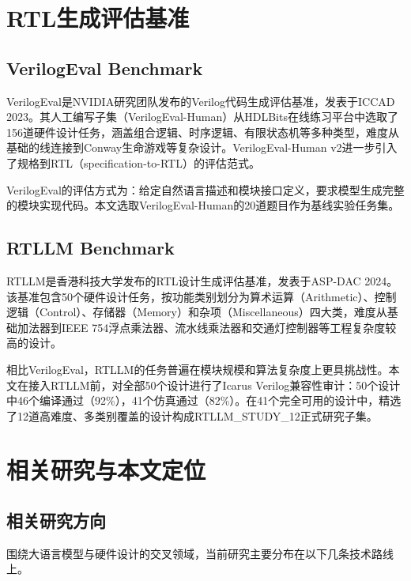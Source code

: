 \section{RTL生成评估基准}

\subsection{VerilogEval Benchmark}

VerilogEval\cite{verilogeval}是NVIDIA研究团队发布的Verilog代码生成评估基准，发表于ICCAD 2023。其人工编写子集（VerilogEval-Human）从HDLBits\cite{hdlbits}在线练习平台中选取了156道硬件设计任务，涵盖组合逻辑、时序逻辑、有限状态机等多种类型，难度从基础的线连接到Conway生命游戏等复杂设计。VerilogEval-Human v2\cite{verilogeval_v2}进一步引入了规格到RTL（specification-to-RTL）的评估范式。

VerilogEval的评估方式为：给定自然语言描述和模块接口定义，要求模型生成完整的模块实现代码。本文选取VerilogEval-Human的20道题目作为基线实验任务集。

\subsection{RTLLM Benchmark}

RTLLM\cite{rtllm}是香港科技大学发布的RTL设计生成评估基准，发表于ASP-DAC 2024。该基准包含50个硬件设计任务，按功能类别划分为算术运算（Arithmetic）、控制逻辑（Control）、存储器（Memory）和杂项（Miscellaneous）四大类，难度从基础加法器到IEEE 754浮点乘法器、流水线乘法器和交通灯控制器等工程复杂度较高的设计。

相比VerilogEval，RTLLM的任务普遍在模块规模和算法复杂度上更具挑战性。本文在接入RTLLM前，对全部50个设计进行了Icarus Verilog兼容性审计：50个设计中46个编译通过（92\%），41个仿真通过（82\%）。在41个完全可用的设计中，精选了12道高难度、多类别覆盖的设计构成RTLLM\_STUDY\_12正式研究子集。

\section{相关研究与本文定位}

\subsection{相关研究方向}

围绕大语言模型与硬件设计的交叉领域，当前研究主要分布在以下几条技术路线上。

